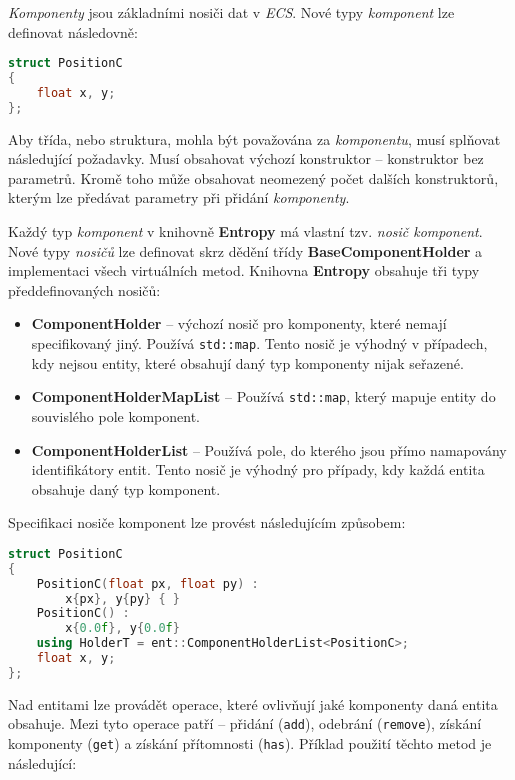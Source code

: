 \emph{Komponenty} jsou základními nosiči dat v \emph{ECS}. Nové typy \emph{komponent} lze definovat následovně:

\begin{lstlisting}[backgroundcolor = \color{lightgray}, language = C++, xleftmargin = 2cm, framexleftmargin = 1em, tabsize=4]
struct PositionC
{
	float x, y;
};
\end{lstlisting}

\noindent Aby třída, nebo struktura, mohla být považována za \emph{komponentu}, musí splňovat následující požadavky. Musí obsahovat výchozí konstruktor -- konstruktor bez parametrů. Kromě toho může obsahovat neomezený počet dalších konstruktorů, kterým lze předávat parametry při přidání \emph{komponenty}. 

Každý typ \emph{komponent} v knihovně \textbf{Entropy} má vlastní tzv. \emph{nosič komponent}. Nové typy \emph{nosičů} lze definovat skrz dědění třídy \textbf{BaseComponentHolder} a implementaci všech virtuálních metod. Knihovna \textbf{Entropy} obsahuje tři typy předdefinovaných nosičů:

\begin{itemize}
	\item \textbf{ComponentHolder} -- výchozí nosič pro komponenty, které nemají specifikovaný jiný. Používá \texttt{std::map}. Tento nosič je výhodný v případech, kdy nejsou entity, které obsahují daný typ komponenty nijak seřazené.
	\item \textbf{ComponentHolderMapList} -- Používá \texttt{std::map}, který mapuje entity do souvislého pole komponent.
	\item \textbf{ComponentHolderList} -- Používá pole, do kterého jsou přímo namapovány identifikátory entit. Tento nosič je výhodný pro případy, kdy každá entita obsahuje daný typ komponent.
\end{itemize}

\noindent Specifikaci nosiče komponent lze provést následujícím způsobem:

\begin{lstlisting}[backgroundcolor = \color{lightgray}, language = C++, xleftmargin = 2cm, framexleftmargin = 1em, tabsize=4]
struct PositionC
{
	PositionC(float px, float py) :
		x{px}, y{py} { }
	PositionC() : 
		x{0.0f}, y{0.0f}
	using HolderT = ent::ComponentHolderList<PositionC>;
	float x, y;
};
\end{lstlisting}

Nad entitami lze provádět operace, které ovlivňují jaké komponenty daná entita obsahuje. Mezi tyto operace patří -- přidání (\texttt{add}), odebrání (\texttt{remove}), získání komponenty (\texttt{get}) a získání přítomnosti (\texttt{has}). Příklad použití těchto metod je následující:

